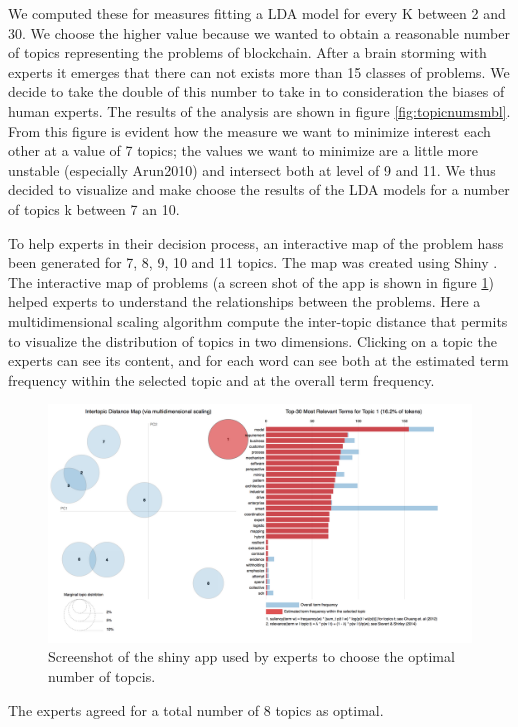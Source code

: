\documentclass[]{book}
\begin{document}
We computed these for measures fitting a LDA model for every K between 2
and 30. We choose the higher value because we wanted to obtain a
reasonable number of topics representing the problems of blockchain.
After a brain storming with experts it emerges that there can not exists
more than 15 classes of problems. We decide to take the double of this
number to take in to consideration the biases of human experts. The
results of the analysis are shown in figure \ref{fig:topicnumsmbl}. From
this figure is evident how the measure we want to minimize interest each
other at a value of 7 topics; the values we want to minimize are a
little more unstable (especially Arun2010) and intersect both at level
of 9 and 11. We thus decided to visualize and make choose the results of
the LDA models for a number of topics k between 7 an 10.

To help experts in their decision process, an interactive map of the
problem hass been generated for 7, 8, 9, 10 and 11 topics. The map was
created using Shiny \citep{shiny2017}. The interactive map of problems
(a screen shot of the app is shown in figure
\ref{fig:topicmodelschinybc}) helped experts to understand the
relationships between the problems. Here a multidimensional scaling
algorithm compute the inter-topic distance that permits to visualize the
distribution of topics in two dimensions. Clicking on a topic the
experts can see its content, and for each word can see both at the
estimated term frequency within the selected topic and at the overall
term frequency.

\begin{figure}

{\centering \includegraphics[width=0.6\linewidth]{_bookdown_files/figures/bc_topicmodel_shiny} 

}

\caption{Screenshot of the shiny app used by experts to choose the optimal number of topcis. }\label{fig:topicmodelschinybc}
\end{figure}

The experts agreed for a total number of 8 topics as optimal.
\end{document}
